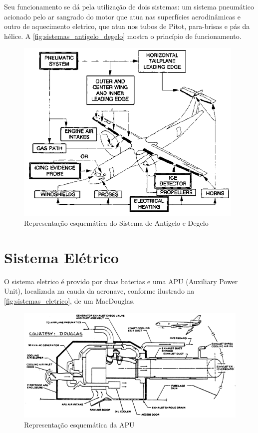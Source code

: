 Seu funcionamento se dá pela utilização de dois sistemas: um sistema pneumático acionado pelo ar sangrado do motor que atua nas superfícies aerodinâmicas e outro de aquecimento eletrico, que atua nos tubos de Pitot, para-brisas e pás da hélice.
A \autoref{fig:sistemas_antigelo_degelo} mostra o princípio de funcionamento.

\begin{figure}
\centering
\includegraphics[width=\textwidth]{images/parte3/sistemas_antigelo_degelo.png}
\caption{Representação esquemática do Sistema de Antigelo e Degelo}
\label{fig:sistemas_antigelo_degelo}
\end{figure}


\section{Sistema Elétrico}

O sistema eletrico é provido por duas baterias e uma APU (Auxiliary Power Unit), localizada na cauda da aeronave, conforme ilustrado na \autoref{fig:sistemas_eletrico}, de um MacDouglas.

\begin{figure}
\centering
\includegraphics[width=\textwidth]{images/parte3/sistemas_eletrico.png}
\caption{Representação esquemática da APU}
\label{fig:sistemas_eletrico}
\end{figure}

